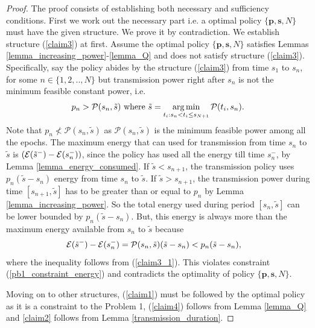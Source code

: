 \begin{proof}

The proof consists of establishing both necessary and sufficiency conditions. First we work out the necessary part i.e. a optimal policy $\{\textbf{p},\textbf{s},N\}$ must have the given structure. We prove it by contradiction. We establish structure (\ref{claim3}) at first. Assume the optimal policy $\{\textbf{p},\textbf{s},N\}$ satisfies Lemmas \ref{lemma_increasing_power}-\ref{lemma_Q} and does not satisfy structure (\ref{claim3}). Specifically, say the policy abides by the  structure (\ref{claim3}) from time $s_{1}$ to $s_n$, for some $n\in \{1,2,..,N\}$ but transmission power right after $s_n$ is not the minimum feasible constant power, i.e.
\begin{align}
p_n>\mathcal{P}(s_n,\tilde{s})\text{ where } \tilde{s}=\argmin_{t_i: s_n < t_i \le s_{N+1}} \mathcal{P}(t_i,s_n).\label{claim3_1}
\end{align}
Note that $p_n\nless \mathcal{P}(s_n,\tilde{s})$ as $\mathcal{P}(s_n,\tilde{s})$ is the minimum feasible power among all the epochs. The maximum energy that can used for transmission from time $s_{n}$ to $\tilde{s}$ is $\left(\mathcal{E}(\tilde{s}^-)-\mathcal{E}(s_{n}^-)\right)$, since the policy has used all the energy till time $s_{n}^-$, by Lemma \ref{lemma_energy_consumed}. If $\tilde{s}<s_{n+1}$, the transmission policy uses $p_n(\tilde{s}-s_{n})$ energy from time $s_n$ to $\tilde{s}$. If $\tilde{s}>s_{n+1}$, the transmission power during time $[s_{n+1},\tilde{s}]$ has to be greater than or equal to $p_n$ by Lemma \ref{lemma_increasing_power}. So the total energy used during period $[s_n,\tilde{s}]$ can be lower bounded by $p_n(\tilde{s}-s_{n})$. But, this energy is always more than the maximum energy available from $s_{n}$ to $\tilde{s}$ because
\begin{align}
&\nonumber\mathcal{E}(\tilde{s}^-)-\mathcal{E}(s_{n}^-)=\mathcal{P}(s_n,\tilde{s})(\tilde{s}-s_{n})<p_n(\tilde{s}-s_{n}),
\end{align}
where the inequality follows from (\ref{claim3_1}). This violates constraint (\ref{pb1_constraint_energy}) and contradicts the optimality of policy $\{\textbf{p},\textbf{s},N\}$.

Moving on to other structures, (\ref{claim1}) must be followed by the optimal policy as it is a constraint to the Problem 1, (\ref{claim4}) follows from Lemma \ref{lemma_Q} and \eqref{claim2} follows from Lemma \ref{transmission_duration}.


\end{proof}
